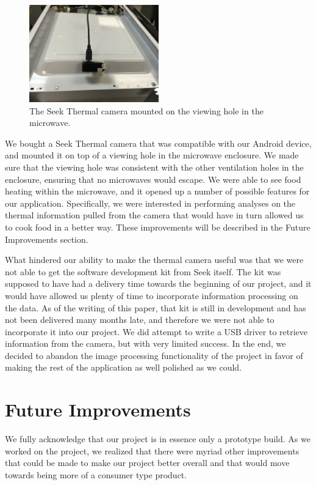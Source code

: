 \documentclass[10pt,journal,letterpaper,twocolumn]{IEEEtran}
\begin{document}
\begin{figure}[h]
\centering
\includegraphics[width=0.5\textwidth]{ThermalCamera.jpeg}
\caption{\label{fig:thermalcam}The Seek Thermal camera mounted on the viewing hole in the microwave.}
\end{figure}

We bought a Seek Thermal camera that was compatible with our Android device, and mounted it on top of a viewing hole in the microwave enclosure.  We made sure that the viewing hole was consistent with the other ventilation holes in the enclosure, ensuring that no microwaves would escape.  We were able to see food heating within the microwave, and it opened up a number of possible features for our application.  Specifically, we were interested in performing analyses on the thermal information pulled from the camera that would have in turn allowed us to cook food in a better way.  These improvements will be described in the Future Improvements section.

What hindered our ability to make the thermal camera useful was that we were not able to get the software development kit from Seek itself.  The kit was supposed to have had a delivery time towards the beginning of our project, and it would have allowed us plenty of time to incorporate information processing on the data.  As of the writing of this paper, that kit is still in development and has not been delivered many months late, and therefore we were not able to incorporate it into our project.  We did attempt to write a USB driver to retrieve information from the camera, but with very limited success.  In the end, we decided to abandon the image processing functionality of the project in favor of making the rest of the application as well polished as we could.

\section{Future Improvements}

We fully acknowledge that our project is in essence only a prototype build.  As we worked on the project, we realized that there were myriad other improvements that could be made to make our project better overall and that would move towards being more of a consumer type product.
\end{document}
